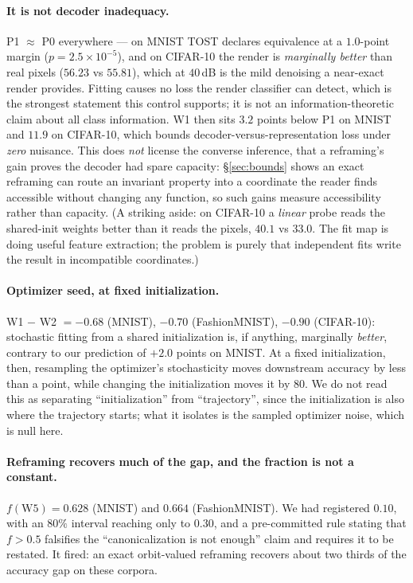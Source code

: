 \documentclass[10pt,twocolumn,letterpaper]{article}
\theoremstyle{definition}
\begin{document}
\paragraph{It is not decoder inadequacy.} P1 $\approx$ P0 everywhere --- on MNIST TOST declares
equivalence at a $1.0$-point margin ($p = 2.5\times10^{-5}$), and on CIFAR-10 the render is
\emph{marginally better} than real pixels ($56.23$ vs $55.81$), which at $40$\,dB is the mild
denoising a near-exact render provides. Fitting causes no loss the render classifier can detect, which is
the strongest statement this control supports; it is not an information-theoretic claim about all
class information. W1 then sits $3.2$ points below P1 on MNIST and $11.9$ on CIFAR-10, which bounds
decoder-versus-representation loss under \emph{zero} nuisance. This does \emph{not} license the converse inference, that a reframing's gain proves the decoder had
spare capacity: \S\ref{sec:bounds} shows an exact reframing can route an invariant property into a
coordinate the reader finds accessible without changing any function, so such gains measure
accessibility rather than capacity.
(A striking aside: on CIFAR-10 a \emph{linear} probe reads the shared-init weights better than it
reads the pixels, $40.1$ vs $33.0$. The fit map is doing useful feature extraction; the problem is
purely that independent fits write the result in incompatible coordinates.)

\paragraph{Optimizer seed, at fixed initialization.} W1 $-$ W2 $= -0.68$ (MNIST),
$-0.70$ (FashionMNIST), $-0.90$ (CIFAR-10): stochastic fitting from a shared initialization is, if
anything, marginally \emph{better}, contrary to our prediction of $+2.0$ points on MNIST. At a
fixed initialization, then, resampling the optimizer's stochasticity moves downstream accuracy by
less than a point, while changing the initialization moves it by $80$. We do not read this as
separating ``initialization'' from ``trajectory'', since the initialization is also where the
trajectory starts; what it isolates is the sampled optimizer noise, which is null here.

\paragraph{Reframing recovers much of the gap, and the fraction is not a constant.}
$f(\mathrm{W5}) = 0.628$ (MNIST) and $0.664$ (FashionMNIST). We had registered $0.10$, with an
$80\%$ interval reaching only to $0.30$, and a pre-committed rule stating that $f > 0.5$ falsifies
the ``canonicalization is not enough'' claim and requires it to be restated. It fired: an exact
orbit-valued reframing recovers about two thirds of the accuracy gap on these corpora.
\end{document}
